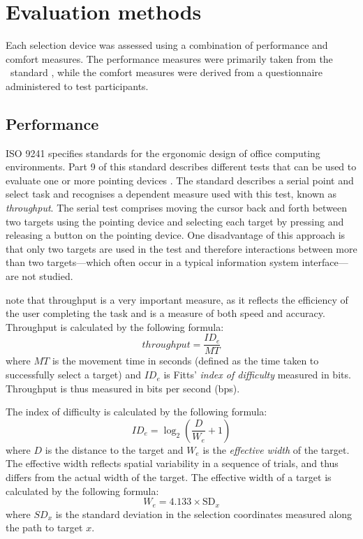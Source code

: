 \documentclass{elsart}
\begin{document}
\section{Evaluation methods}
\label{sec-evaluation}

Each selection device was assessed using a combination of performance
and comfort measures. The performance measures were primarily taken from
the \ISOnine\ standard \citep{ISO-2000-9241-9}, while the comfort
measures were derived from a questionnaire administered to test
participants.


\subsection{Performance}
\label{sec-evaluation-performance}

ISO 9241 specifies standards for the ergonomic design of office
computing environments. Part 9 of this standard describes different
tests that can be used to evaluate one or more pointing devices
\citep{ISO-2000-9241-9}. The standard describes a serial point and
select task and recognises a dependent measure used with this test,
known as \emph{throughput}. The serial test comprises moving the cursor
back and forth between two targets using the pointing device and
selecting each target by pressing and releasing a button on the pointing
device. One disadvantage of this approach is that only two targets are
used in the test and therefore interactions between more than two
targets---which often occur in a typical information system
interface---are not studied.

\citet{Mack-IS-2001-EHCI} note that throughput
is a very important measure, as it reflects the efficiency of the user
completing the task and is a measure of both speed and
accuracy. Throughput is calculated by the following formula:
\begin{equation}
	\label{eqn-throughput}
	\mathit{throughput} = \frac{\mathit{ID}_{e}}{\mathit{MT}}
\end{equation}
where \(\mathit{MT}\) is the movement time in seconds (defined as the
time taken to successfully select a target) and \(\mathit{ID}_{e}\) is
Fitts' \citeyearpar{Fitt-PM-1954-Law} \emph{index of difficulty}
measured in bits. Throughput is thus measured in bits per second (bps).

The index of difficulty is calculated by the following formula:
\begin{equation}
	\label{eqn-IDe}
	\mathit{ID}_{e} = \log_{2}\left(\frac{D}{W_{e}} + 1\right)
\end{equation}
where \(D\) is the distance to the target and \(W_{e}\) is the
\emph{effective width} of the target. The effective width reflects
spatial variability in a sequence of trials, and thus differs from the
actual width of the target. The effective width of a target is
calculated by the following formula:
\begin{equation}
	\label{eqn-We}
	W_{e} = 4.133 \times \mathrm{SD}_{x}
\end{equation}
where \(\mathit{SD}_{x}\) is the standard deviation in the selection
coordinates measured along the path to target \(x\).
\end{document}
